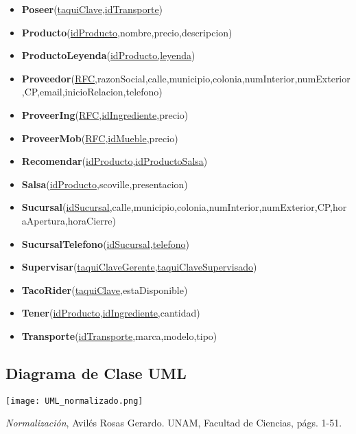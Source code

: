 \documentclass[11pt,letterpaper]{article}
\begin{document}
\begin{itemize}
\item \footnotesize{\textbf{Poseer}(\underline{taquiClave},\underline{idTransporte})}
\item \footnotesize{\textbf{Producto}(\underline{idProducto},nombre,precio,descripcion)}
\item \footnotesize{\textbf{ProductoLeyenda}(\underline{idProducto,leyenda})}
\item \scriptsize{\textbf{Proveedor}(\underline{RFC},razonSocial,calle,municipio,colonia,numInterior,numExterior,CP,email,inicioRelacion,telefono)}
\item \footnotesize{\textbf{ProveerIng}(\underline{RFC},\underline{idIngrediente},precio)}
\item \footnotesize{\textbf{ProveerMob}(\underline{RFC},\underline{idMueble},precio)}
\item \footnotesize{\textbf{Recomendar}(\underline{idProducto},\underline{idProductoSalsa})}
\item \footnotesize{\textbf{Salsa}(\underline{idProducto},scoville,presentacion)}
\item {\footnotesize \textbf{Sucursal}(\underline{idSucursal},calle,municipio,colonia,numInterior,numExterior,CP,horaApertura,horaCierre)}
\item \footnotesize{\textbf{SucursalTelefono}(\underline{idSucursal},\underline{telefono})}
\item \footnotesize{\textbf{Supervisar}(\underline{taquiClaveGerente},\underline{taquiClaveSupervisado})}
\item \footnotesize{\textbf{TacoRider}(\underline{taquiClave},estaDisponible)}
\item \footnotesize{\textbf{Tener}(\underline{idProducto},\underline{idIngrediente},cantidad)}
\item \footnotesize{\textbf{Transporte}(\underline{idTransporte},marca,modelo,tipo)}

\end{itemize}
\subsection{Diagrama de Clase UML}

 \begin{landscape}
\begin{center}
\begin{minipage}{1\linewidth}
\texttt{[image: UML\_normalizado.png]}
\end{minipage}
\end{center}
\end{landscape}





\newpage 
 \begin{thebibliography}{1}


     \textit{Normalización}, Avilés Rosas Gerardo. UNAM, Facultad de Ciencias, págs. 1-51.


  \end{thebibliography}
\end{document}
